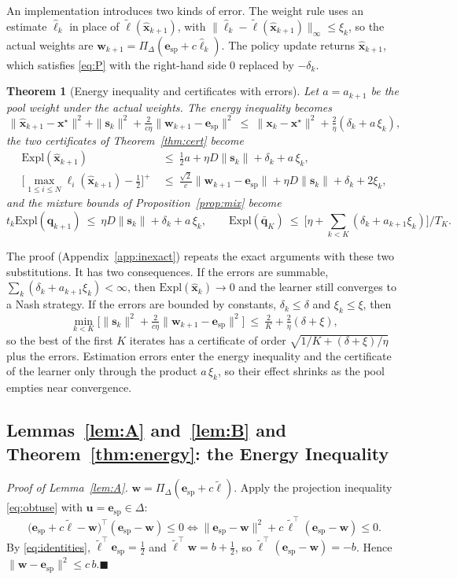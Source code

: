 \documentclass{article} %
\theoremstyle{plain}
\newtheorem{theorem}{Theorem}[section]
\theoremstyle{remark}
\newcommand{\Expl}{\mathrm{Expl}}
\newcommand{\Proj}{\Pi}
\newcommand{\simplex}{\Delta}
\newcommand{\bx}{{\bm{x}}}
\newcommand{\bw}{{\bm{w}}}
\newcommand{\bu}{{\bm{u}}}
\newcommand{\bq}{{\bm{q}}}
\newcommand{\be}{{\bm{e}}}
\newcommand{\bell}{{\bm{\ell}}}
\newcommand{\aug}{\tilde{\bell}}
\newcommand{\xs}{\bx^{\star}}
\newcommand{\dx}{{\bm{s}}}
\newcommand{\esp}{\be_{\mathrm{sp}}}
\begin{document}
An implementation introduces two kinds of error. The weight rule uses an estimate $\hat{\bell}_k$ in place of $\aug(\hat \bx_{k+1})$, with $\|\hat{\bell}_k-\aug(\hat \bx_{k+1})\|_\infty\le\xi_k$, so the actual weights are $\bw_{k+1}=\Proj_\simplex(\esp+c\hat{\bell}_k)$. The policy update returns $\hat \bx_{k+1}$, which satisfies \eqref{eq:P} with the right-hand side $0$ replaced by $-\delta_k$.
\begin{theorem}[Energy inequality and certificates with errors]
\label{thm:inexact}
Let $a=a_{k+1}$ be the pool weight under the actual weights. The energy inequality becomes
\[
\|\hat \bx_{k+1}-\xs\|^2+\|\dx_k\|^2+\tfrac{2}{c\eta}\|\bw_{k+1}-\esp\|^2\ \le\ \|\bx_k-\xs\|^2+\tfrac2\eta(\delta_k+a\,\xi_k),
\]
the two certificates of Theorem~\ref{thm:cert} become
\begin{align*}
\Expl(\hat \bx_{k+1})&\ \le\ \tfrac12a+\eta D\|\dx_k\|+\delta_k+a\,\xi_k,\\
\Big[\max_{1\le i\le N}\ell_i(\hat \bx_{k+1})-\tfrac12\Big]^+&\ \le\ \tfrac{\sqrt2}{c}\|\bw_{k+1}-\esp\|+\eta D\|\dx_k\|+\delta_k+2\xi_k,
\end{align*}
and the mixture bounds of Proposition~\ref{prop:mix} become
\[
t_k\Expl(\bq_{k+1})\ \le\ \eta D\|\dx_k\|+\delta_k+a\,\xi_k,\qquad
\Expl(\bar{\bq}_K)\ \le\ \Big[\eta+\textstyle\sum_{k<K}(\delta_k+a_{k+1}\xi_k)\Big]\big/T_K .
\]
\end{theorem}
The proof (Appendix~\ref{app:inexact}) repeats the exact arguments with these two substitutions. It has two consequences. If the errors are summable, $\sum_k(\delta_k+a_{k+1}\xi_k)<\infty$, then $\Expl(\hat\bx_k)\to0$ and the learner still converges to a Nash strategy. If the errors are bounded by constants, $\delta_k\le\delta$ and $\xi_k\le\xi$, then
\[
\min_{k<K}\Big[\|\dx_k\|^2+\tfrac{2}{c\eta}\|\bw_{k+1}-\esp\|^2\Big]\ \le\ \tfrac2K+\tfrac2\eta(\delta+\xi) ,
\]
so the best of the first $K$ iterates has a certificate of order $\sqrt{1/K+(\delta+\xi)/\eta}$ plus the errors. Estimation errors enter the energy inequality and the certificate of the learner only through the product $a\,\xi_k$, so their effect shrinks as the pool empties near convergence.

\subsection{Lemmas~\ref{lem:A} and~\ref{lem:B} and Theorem~\ref{thm:energy}: the Energy Inequality}
\label{app:energy}

\textit{Proof of Lemma~\ref{lem:A}.} $\bw=\Proj_\simplex(\esp+c\aug)$. Apply the projection inequality \eqref{eq:obtuse} with $\bu=\esp\in\simplex$:
\[
\big(\esp+c\aug-\bw\big)^\top(\esp-\bw)\le0
\iff\|\esp-\bw\|^2+c\,\aug^\top(\esp-\bw)\le0 .
\]
By \eqref{eq:identities}, $\aug^\top \esp=\tfrac12$ and $\aug^\top \bw=b+\tfrac12$, so $\aug^\top(\esp-\bw)=-b$. Hence $\|\bw-\esp\|^2\le c\,b$.\hfill$\blacksquare$
\end{document}
